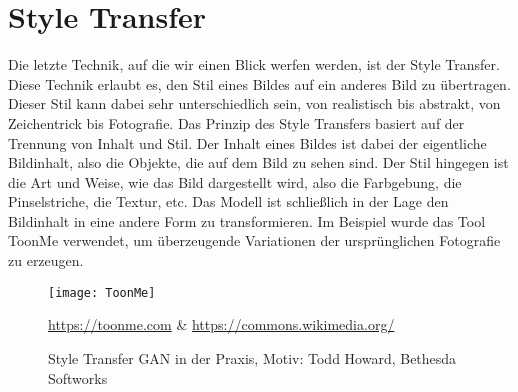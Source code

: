 \section{Style Transfer}

\noindent Die letzte Technik, auf die wir einen Blick werfen werden, ist der Style Transfer. Diese Technik erlaubt es, den Stil eines Bildes auf ein anderes Bild zu übertragen. Dieser Stil kann dabei sehr unterschiedlich sein, von realistisch bis abstrakt, von Zeichentrick bis Fotografie. Das Prinzip des Style Transfers basiert auf der Trennung von Inhalt und Stil. Der Inhalt eines Bildes ist dabei der eigentliche Bildinhalt, also die Objekte, die auf dem Bild zu sehen sind. Der Stil hingegen ist die Art und Weise, wie das Bild dargestellt wird, also die Farbgebung, die Pinselstriche, die Textur, etc. Das Modell ist schließlich in der Lage den Bildinhalt in eine andere Form zu transformieren. Im Beispiel wurde das Tool ToonMe verwendet, um überzeugende Variationen der ursprünglichen Fotografie zu erzeugen.\\

\begin{figure}[H]
    \centering
    \texttt{[image: ToonMe]}
    \caption{Style Transfer GAN in der Praxis, Motiv: Todd Howard, Bethesda Softworks} \quelle\url{https://toonme.com} \& \url{https://commons.wikimedia.org/}
\label{fig:deep_learning}
\end{figure}

\newpage
